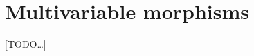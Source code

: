 \documentclass{amsart}
\newcommand{\C}{\cC}
\renewcommand{\Chat}{\ensuremath{\widehat{\C}}\xspace}
\newcommand{\Chats}{\ensuremath{\Chat_{\Sigma}}\xspace}
\newcommand{\E}{\cE}
\newcommand{\one}{\done}
\begin{document}




\section{Multivariable morphisms}
\label{sec:multivar}

[TODO\dots]






\end{document}
